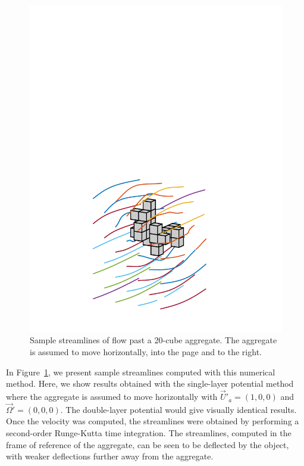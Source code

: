 \begin{figure}[ht]
	\begin{center}
	  \includegraphics[scale = 0.4]{./figures/fig_streamlines25_fig120.pdf}
	 \end{center}
	\caption{Sample streamlines of flow past a 20-cube aggregate. The aggregate is assumed to move horizontally, into the page and to the right.
	}
	\label{fig_stream}
	\end{figure}
	
	In Figure~\ref{fig_stream}, we present sample streamlines computed with this numerical method. Here, we show results obtained with the single-layer potential method where the aggregate is assumed to move horizontally with $\vec{U}'_a = (1,0,0)$ and $\vec{\Omega}' = (0,0,0)$. 
	The double-layer potential would give visually identical results. Once the velocity was computed, the streamlines were obtained by performing a second-order Runge-Kutta time integration.  The streamlines, computed in the frame of reference of the aggregate, can be seen to be deflected by the object, with weaker deflections further away from the aggregate.


